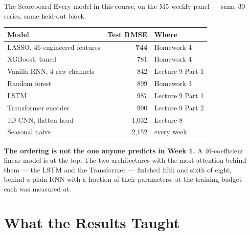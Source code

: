 \documentclass[aspectratio=169, 11pt]{beamer}
\begin{document}
\begin{frame}{The Scoreboard}
  Every model in this course, on the M5 weekly panel --- same 30 series, same held-out block.
  \begin{center}
    {\small
    \begin{tabular}{lrl}
      \toprule
      \textbf{Model} & \textbf{Test RMSE} & \textbf{Where} \\
      \midrule
      LASSO, 46 engineered features & \textbf{744} & Homework 4 \\
      XGBoost, tuned & 781 & Homework 4 \\
      Vanilla RNN, 4 raw channels & 842 & Lecture 9 Part 1 \\
      Random forest & 899 & Homework 3 \\
      LSTM & 987 & Lecture 9 Part 1 \\
      Transformer encoder & 990 & Lecture 9 Part 2 \\
      1D CNN, flatten head & 1{,}032 & Lecture 8 \\
      \midrule
      Seasonal naive & 2{,}152 & every week \\
      \bottomrule
    \end{tabular}
    }
  \end{center}

  \vspace{-0.05cm}
  \textbf{The ordering is not the one anyone predicts in Week 1.} A 46-coefficient linear model
  is at the top. The two architectures with the most attention behind them --- the LSTM and the
  Transformer --- finished fifth and sixth of eight, behind a plain RNN with a fraction of their
  parameters, at the training budget each was measured at.
\end{frame}

\section{What the Results Taught}

\end{document}
